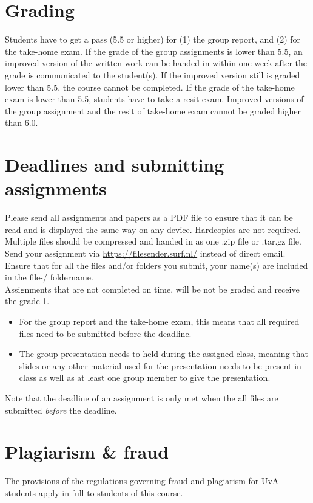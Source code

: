 \documentclass[a4paper,10pt,twocolumn]{report}
\begin{document}
\section{Grading}
Students have to get a pass (5.5 or higher) for (1) the group report, and (2) for the take-home exam. If the grade of the group assignments is lower than 5.5, an improved version of the written work can be handed in within one week after the grade is communicated to the student(s). If the improved version still is graded lower than 5.5, the course cannot be completed. If the grade of the take-home exam is lower than 5.5, students have to take a resit exam. Improved versions of the group assignment and the resit of take-home exam cannot be graded higher than 6.0. 

\section{Deadlines and submitting assignments}
Please send all assignments and papers as a PDF file to ensure that it can be read and is displayed the same way on any device. Hardcopies are not required. Multiple files should be compressed and handed in as one .zip file or .tar.gz file. Send your assignment via \url{https://filesender.surf.nl/} instead of direct email. Ensure that for all the files and/or folders you submit, your name(s) are included in the file-/ foldername. \\
	
Assignments that are not completed on time, will be not be graded and receive the grade 1. 
	\begin{itemize}
		\item For the group report and the take-home exam, this means that all required files need to be submitted before the deadline. 
		\item The group presentation needs to held during the assigned class, meaning that slides or any other material used for the presentation needs to be present in class as well as at least one group member to give the presentation. 
	\end{itemize}
Note that the deadline of an assignment is only met when the all files are submitted \emph{before} the deadline.

\section{Plagiarism \& fraud}
The provisions of the regulations governing fraud and plagiarism for UvA students apply in full to students of this course. \\
\end{document}
